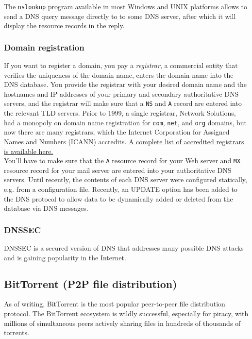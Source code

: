 \documentclass[8pt, table, xcdraw]{article}%
\begin{document}
The \texttt{nslookup} program available in most Windows and UNIX platforms allows to send a DNS query message directly to to some DNS server, after which it will display the resource records in the reply.

\subsubsection{Domain registration}

If you want to register a domain, you pay a \emph{registrar}, a commercial entity that verifies the uniqueness of the domain name, enters the domain name into the DNS database. You provide the registrar with your desired domain name and the hostnames and IP addresses of your primary and secondary authoritative DNS servers, and the registrar will make sure that a \texttt{NS} and \texttt{A} record are entered into the relevant TLD servers. Prior to 1999, a single registrar, Network Solutions, had a monopoly on domain name registration for \texttt{com}, \texttt{net}, and \texttt{org} domains, but now there are many registrars, which the Internet Corporation for Assigned Names and Numbers (ICANN) accredits. \href{http://www.internic.net}{A complete list of accredited registrars is available here.}\\
You’ll have to make sure that the \texttt{A} resource record for your Web server and \texttt{MX} resource record for your mail server are entered into your authoritative DNS servers. Until recently, the contents of each DNS server were configured statically, e.g. from a configuration file. Recently, an UPDATE option has been added to the DNS protocol to allow data to be dynamically added or deleted from the database via DNS messages.

\subsubsection{DNSSEC}

DNSSEC is a secured version of DNS that addresses many possible DNS attacks and is gaining popularity in the Internet.

\subsection{BitTorrent (P2P file distribution)}

As of writing, BitTorrent is the most popular peer-to-peer file distribution protocol. The BitTorrent ecosystem is wildly successful, especially for piracy, with millions of simultaneous peers actively sharing files in hundreds of thousands of torrents.
\end{document}

